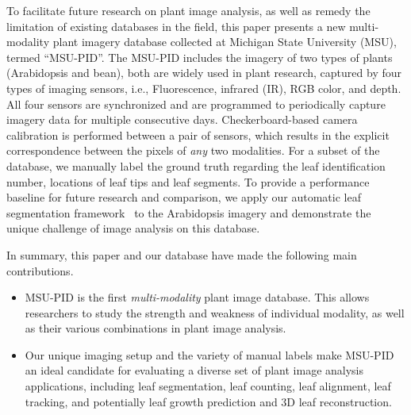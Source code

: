 To facilitate future research on plant image analysis, as well as remedy the limitation of existing databases in the field, this paper presents a new multi-modality plant imagery database collected at Michigan State University (MSU), termed ``MSU-PID''. The MSU-PID includes the imagery of two types of plants (Arabidopsis and bean), both are widely used in plant research, captured by four types of imaging sensors, i.e., Fluorescence, infrared (IR), RGB color, and depth.
All four sensors are synchronized and are programmed to periodically capture imagery data for multiple consecutive days. Checkerboard-based camera calibration is performed between a pair of sensors, which results in the explicit correspondence between the pixels of {\it any} two modalities. 
For a subset of the database, we manually label the ground truth regarding the leaf identification number, locations of leaf tips and leaf segments. 
To provide a performance baseline for future research and comparison, we apply our automatic leaf segmentation framework~\cite{yin2014a,yin2014b} to the Arabidopsis imagery and demonstrate the unique challenge of image analysis on this database.





In summary, this paper and our database have made the following main contributions.
\begin{itemize}
\item MSU-PID is the first {\it multi-modality} plant image database. This allows researchers to study the strength and weakness of individual modality, as well as their various combinations in plant image analysis.
\item Our unique imaging setup and the variety of manual labels make MSU-PID an ideal candidate for evaluating a diverse set of plant image analysis applications, including leaf segmentation, leaf counting, leaf alignment, leaf tracking, and potentially leaf growth prediction and $3$D leaf reconstruction.
\end{itemize}




